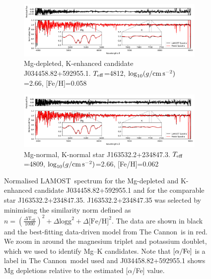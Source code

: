 \documentclass[a4paper,fleqn,usenatbib]{mnras}
\newcommand{\project}[1]{#1}
\newcommand{\lamost}{\project{LAMOST}}
\newcommand{\tc}{\project{The Cannon}}
\newcommand{\teff}{T_{\rm eff}}
\newcommand{\logg}{\log_{10}(g/{\rm cm\,s}^{-2})}
\begin{document}
\begin{figure}
\centering
\begin{subfigure}{1\textwidth}
\centering
\includegraphics[width=\textwidth=1]{posterchild.png}
\caption{Mg-depleted, K-enhanced candidate J034458.82+592955.1. $\teff$=4812, $\logg$=2.66, [Fe/H]=0.058}
\end{subfigure}

\begin{subfigure}{1\textwidth}
\centering
\includegraphics[width=\textwidth=1]{postermimic.png}
\caption{Mg-normal, K-normal star J163532.2+234847.3. $\teff$=4809, $\logg$=2.66, [Fe/H]=0.062}
\end{subfigure}

\caption{Normalised \lamost\ spectrum for the Mg-depleted and K-enhanced candidate J034458.82+592955.1 and for the comparable star J163532.2+234847.35. J163532.2+234847.35 was selected by minimising the similarity norm defined as $n=(\frac{\Delta \text{T}_{\text{eff}}}{1000})^2 +\Delta \text{logg} ^2 + \Delta \text{[Fe/H]}^2$. The data are shown in black and the best-fitting data-driven model from \tc\ is in red. We zoom in around the magnesium triplet and potassium doublet, which we used to identify Mg--K candidates. Note that $[\alpha/{\rm Fe}]$ is a label in \tc\ model used and J034458.82+592955.1 shows Mg depletions relative to the estimated [$\alpha$/Fe] value.}
\label{posterchild}
\end{figure}
\end{document}
